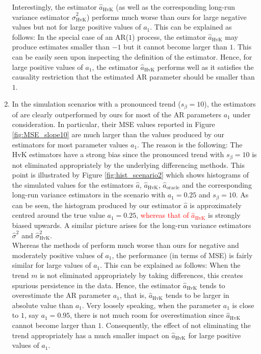\begin{enumerate}[label=(\alph*),leftmargin=0.7cm]
Interestingly, the estimator $\widehat{a}_{\text{HvK}}$ (as well as the corresponding long-run variance estimator $\widehat{\sigma}^2_{\text{HvK}}$) performs much worse than ours for large negative values but not for large positive values of $a_1$. This can be explained as follows: In the special case of an AR($1$) process, the estimator $\widehat{a}_{\text{HvK}}$ may produce estimates smaller than $-1$ but it cannot become larger than $1$. This can be easily seen upon inspecting the definition of the estimator. Hence, for large positive values of $a_1$, the estimator $\widehat{a}_{\text{HvK}}$ performs well as it satisfies the causality restriction that the estimated AR parameter should be smaller than $1$. 

\item In the simulation scenarios with a pronounced trend ($s_\beta = 10$), the estimators of \cite{Hall2003} are clearly outperformed by ours for most of the AR parameters $a_1$ under consideration. In particular, their MSE values reported in Figure \ref{fig:MSE_slope10} are much larger than the values produced by our estimators for most parameter values $a_1$. The reason is the following: The HvK estimators have a strong bias since the pronounced trend with $s_\beta = 10$ is not eliminated appropriately by the underlying differencing methods. This point is illustrated by Figure \ref{fig:hist_scenario2} which shows histograms of the simulated values for the estimators $\widehat{a}$, $\widehat{a}_{\text{HvK}}$, $\widehat{a}_{\text{oracle}}$ and the corresponding long-run variance estimators in the scenario with $a_1=0.25$ and $s_\beta = 10$. As can be seen, the histogram produced by our estimator $\widehat{a}$ is approximately centred around the true value $a_1 = 0.25$, \textcolor{red}{whereas that of $\widehat{a}_{\text{HvK}}$} is strongly biased upwards. A similar picture arises for the long-run variance estimators $\widehat{\sigma}^2$ and $\widehat{\sigma}^2_{\text{HvK}}$. \\
Whereas the methods of \cite{Hall2003} perform much worse than ours for negative and moderately positive values of $a_1$, the performance (in terms of MSE) is fairly similar for large values of $a_1$. This can be explained as follows: When the trend $m$ is not eliminated appropriately by taking differences, this creates spurious persistence in the data. Hence, the estimator $\widehat{a}_{\text{HvK}}$ tends to overestimate the AR parameter $a_1$, that is, $\widehat{a}_{\text{HvK}}$ tends to be larger in absolute value than $a_1$. Very loosely speaking, when the parameter $a_1$ is close to $1$, say $a_1 = 0.95$, there is not much room for overestimation since $\widehat{a}_{\text{HvK}}$ cannot become larger than $1$. Consequently, the effect of not eliminating the trend appropriately has a much smaller impact on $\widehat{a}_{\text{HvK}}$ for large positive values of $a_1$. 


\end{enumerate}
